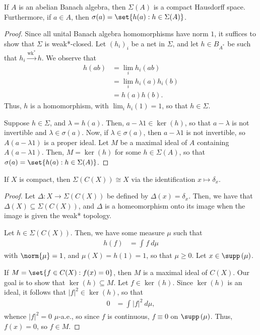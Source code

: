 \documentclass[10pt]{mypackage}
\begin{document}
\begin{theorem}
  If $A$ is an abelian Banach algebra, then $\Sigma(A)$ is a compact Hausdorff space. Furthermore, if $a\in A$, then $\sigma(a) = \set{h(a) : h\in \Sigma(A)}$.
\end{theorem}
\begin{proof}
  Since all unital Banach algebra homomorphisms have norm $1$, it suffices to show that $\Sigma$ is weak*-closed. Let $\left( h_i \right)_i$ be a net in $\Sigma$, and let $h\in B_{A^{\ast}}$ be such that $h_i\xrightarrow{\operatorname{wk}^{\ast}} h$. We observe that
  \begin{align*}
    h(ab) &= \lim_{i}h_i(ab)\\
          &= \lim_{i} h_i(a)h_i(b)\\
          &= h(a)h(b).
  \end{align*}
  Thus, $h$ is a homomorphism, with $\lim_ih_i(1) = 1$, so that $h\in \Sigma$.

  Suppose $h\in \Sigma$, and $\lambda = h(a)$. Then, $a-\lambda1\in \ker\left( h \right)$, so that $a-\lambda$ is not invertible and $\lambda\in \sigma(a)$. Now, if $\lambda\in \sigma(a)$, then $a-\lambda1$ is not invertible, so $A\left( a-\lambda1 \right)$ is a proper ideal. Let $M$ be a maximal ideal of $A$ containing $A\left( a-\lambda1 \right)$. Then, $M = \ker\left( h \right)$ for some $h\in \Sigma(A)$, so that $\sigma(a) = \set{h(a) : h\in \Sigma(A)}$.
\end{proof}
\begin{theorem}
  If $X$ is compact, then $\Sigma\left( C(X) \right) \cong X$ via the identification $x\mapsto \delta_x$.
\end{theorem}
\begin{proof}
  Let $\Delta\colon X\rightarrow \Sigma\left( C(X) \right)$ be defined by $\Delta(x) = \delta_x$. Then, we have that $\Delta\left( X \right)\subseteq \Sigma\left( C(X) \right)$, and $\Delta$ is a homeomorphism onto its image when the image is given the weak* topology.

  Let $h\in \Sigma\left( C(X) \right)$. Then, we have some measure $\mu$ such that
  \begin{align*}
    h(f) &= \int_{}^{} f\:d\mu
  \end{align*}
  with $\norm{\mu} = 1$, and $\mu\left( X \right) = h(1) = 1$, so that $\mu\geq 0$. Let $x\in \supp\left( \mu \right)$.

  If $M = \set{f\in C(X) : f(x) = 0}$, then $M$ is a maximal ideal of $C(X)$. Our goal is to show that $\ker\left( h \right)\subseteq M$. Let $f\in \ker\left( h \right)$. Since $\ker\left( h \right)$ is an ideal, it follows that $ \left\vert f \right\vert^2 \in \ker\left( h \right) $, so that
  \begin{align*}
    0 &= \int_{}^{} \left\vert f \right\vert^2\:d\mu,
  \end{align*}
  whence $\left\vert f \right\vert^2 = 0$ $\mu$-a.e., so since $f$ is continuous, $f\equiv 0$ on $\supp\left( \mu \right)$. Thus, $f(x) = 0$, so $f\in M$.
\end{proof}
\end{document}
